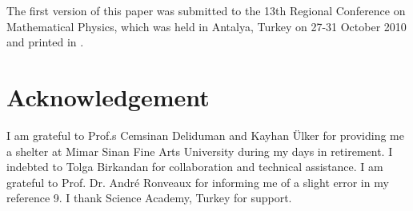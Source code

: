\documentclass{article}
\begin{document}
\noindent The first version of this paper was submitted to the
13th Regional Conference on Mathematical Physics, which was held
in Antalya, Turkey on 27-31 October 2010 and printed in
\cite{mahmut}.




\section{ Acknowledgement}

\noindent I am grateful to Prof.s Cemsinan Deliduman and Kayhan \"{Ulker} for providing me a shelter at Mimar Sinan Fine Arts University during my days in retirement.
  I indebted to Tolga Birkandan for collaboration and technical assistance.  I am  grateful to  Prof. Dr.
Andr\'{e} Ronveaux for informing me of a slight error in my
reference 9.
 I thank
Science Academy,  Turkey for support.
\end{document}
